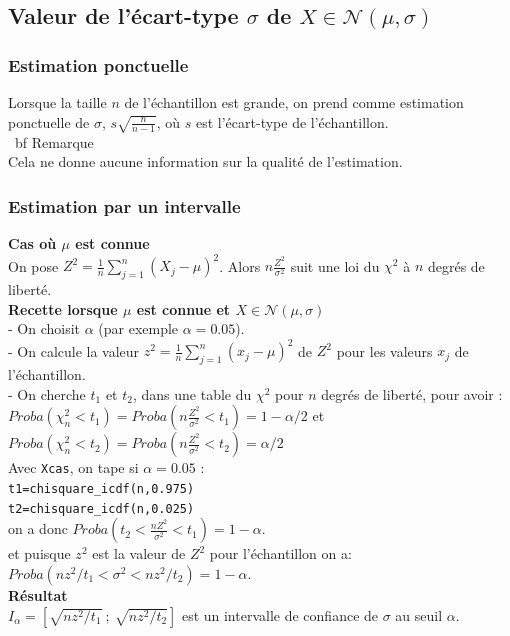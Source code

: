 \documentclass[a4paper,11pt]{book}
\begin{document}
\subsection{Valeur de l'\'ecart-type  $\sigma$ de $X\in \mathcal N(\mu,\sigma)$}
\subsubsection{Estimation ponctuelle}
Lorsque la taille $n$ de l'\'echantillon est grande, on prend comme
estimation ponctuelle de $\sigma$, $s\sqrt{\frac{n}{n-1}}$, o\`u
$s$ est l'\'ecart-type de l'\'echantillon.\\
{\ bf Remarque}\\
Cela ne donne aucune information sur la qualit\'e de l'estimation. 
\subsubsection{Estimation par un intervalle}
{\bf Cas o\`u $\mu$ est connue}\\
On pose $Z^2=\frac{1}{n}\sum_{j=1}^n(X_j-\mu)^2$.
Alors $\displaystyle n\frac{Z^2}{\sigma^2}$ suit une loi du $\chi^2$ \`a $n$ 
degr\'es de libert\'e.\\
{\bf Recette lorsque $\mu$ est connue et $X \in \mathcal N(\mu,\sigma)$}\\
- On choisit $\alpha$ (par exemple $\alpha=0.05$).\\
- On calcule la valeur $z^2=\frac{1}{n}\sum_{j=1}^n(x_j-\mu)^2$ de $Z^2$ pour 
les valeurs $x_j$ de l'\'echantillon.\\ 
- On cherche $t_1$ et $t_2$, dans une table du $\chi^2$ pour $n$ degr\'es de 
libert\'e, pour avoir :\\
$Proba(\chi_n^2<t_1)=Proba(n\frac{Z^2}{\sigma^2}<t_1)=1-\alpha/2$ et\\
$Proba(\chi_n^2<t_2)=Proba(n\frac{Z^2}{\sigma^2}<t_2)=\alpha/2$ \\
Avec {\tt Xcas}, on tape si $\alpha=0.05$ :\\
{\tt t1=chisquare\_icdf(n,0.975)}\\
{\tt t2=chisquare\_icdf(n,0.025)}\\
on a donc 
$Proba(t_2<\frac{nZ^2}{\sigma^2}<t_1)=1-\alpha$.\\
et puisque $z^2$ est la valeur de $Z^2$ pour l'\'echantillon on a:\\ 
$Proba(nz^2/t_1<\sigma^2<nz^2/t_2)=1-\alpha$.\\
{\bf R\'esultat}\\
$I_{\alpha}=[\sqrt{nz^2/t_1}\ ;\ \sqrt{nz^2/t_2}]$ est un intervalle de 
confiance de $\sigma$ au seuil
 $\alpha$.\\
\end{document}
